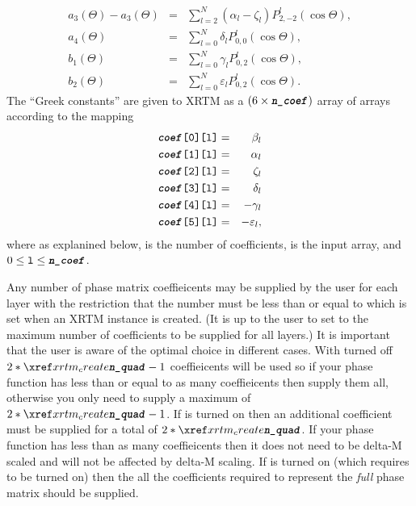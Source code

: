 {\begin{eqnarray*}
a_{3}(\Theta) - a_{3}(\Theta) &=& \sum^{N}_{l = 2} (\alpha_{l} - \zeta_{l}) P^{l}_{2,-2}(\cos{\Theta}), \\
a_{4}(\Theta) &=& \sum^{N}_{l = 0} \delta_{l} P^{l}_{0,0}(\cos{\Theta}), \\
b_{1}(\Theta) &=& \sum^{N}_{l = 0} \gamma_{l} P^{l}_{0,2}(\cos{\Theta}), \\
b_{2}(\Theta) &=& \sum^{N}_{l = 0} \varepsilon_{l} P^{l}_{0,2}(\cos{\Theta}).
\end{eqnarray*}
The ``Greek constants'' are given to XRTM as a $(6 \times \texttt{\textit{\textbf{n\_coef}}})$ array of arrays according to the mapping
\begin{eqnarray*}
\texttt{\textit{\textbf{coef}}[0][l]} &=& \beta_{l} \\
\texttt{\textit{\textbf{coef}}[1][l]} &=& \alpha_{l} \\
\texttt{\textit{\textbf{coef}}[2][l]} &=& \zeta_{l} \\
\texttt{\textit{\textbf{coef}}[3][l]} &=& \delta_{l} \\
\texttt{\textit{\textbf{coef}}[4][l]} &=& -\gamma_{l} \\
\texttt{\textit{\textbf{coef}}[5][l]} &=& -\varepsilon_{l},
\end{eqnarray*}
where as explanined below,  is the number of coefficients,  is the input array, and $0 \le \texttt{l} \le \texttt{\textit{\textbf{n\_coef}}}$.

Any number of phase matrix coeffieicents may be supplied by the user for each layer with the restriction that the number must be less than or equal to  which is set when an XRTM instance is created. (It is up to the user to set  to the maximum number of coefficients to be supplied for all layers.)  It is important that the user is aware of the optimal choice in different cases.  With  turned off $2 * \createarg{n\_quad} - 1$ coeffieicents will be used so if your phase function has less than or equal to as many coeffieicents then supply them all, otherwise you only need to supply a maximum of $2 * \createarg{n\_quad} - 1$.  If  is turned on then an additional coefficient must be supplied for a total of $2 * \createarg{n\_quad}$.  If your phase function has less than as many coeffieicents then it does not need to be delta-M  scaled and will not be affected by delta-M scaling.  If  is turned on (which requires   to be turned on) then the all the coefficients required to represent the \emph{full} phase matrix should be supplied.

}
